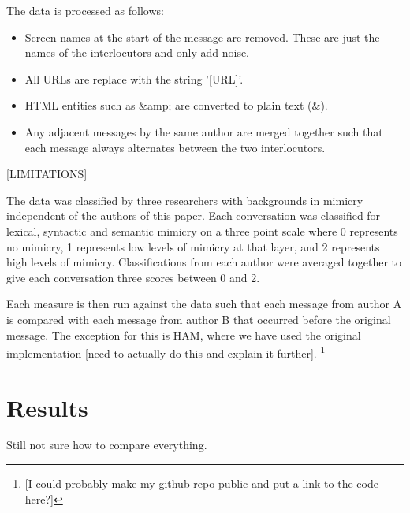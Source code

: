 \documentclass[conference]{IEEEtran}
\begin{document}
{The data is processed as follows:
\begin{itemize}
	\item Screen names at the start of the message are removed. These are just the names of the 
		  interlocutors and only add noise.
	\item All URLs are replace with the string '[URL]'.
	\item HTML entities such as \&amp; are converted to plain text (\&).
	\item Any adjacent messages by the same author are merged together such that each message always
	      alternates between the two interlocutors.
\end{itemize}

[LIMITATIONS]

The data was classified by three researchers with backgrounds in mimicry independent of the authors of 
this paper.
Each  conversation was classified for lexical, syntactic and semantic mimicry on a three point scale 
where 0 represents no mimicry, 1 represents low levels of mimicry at that layer, and 2 represents high 
levels of mimicry. Classifications from each author were averaged together to give each conversation
three scores between 0 and 2.

Each measure is then run against the data such that each message from author A is compared with each 
message from author B that occurred before the original message. The exception for this is HAM,
where we have used the original implementation [need to actually do this and explain it further].
\footnote{[I could probably make my github repo public and put a link to the code here?]}


\section{Results}
Still not sure how to compare everything.

%
%

}
\end{document}
